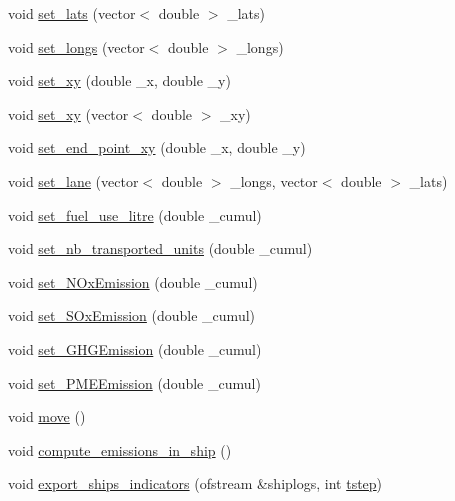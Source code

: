 \begin{DoxyCompactItemize}
\item 
void \mbox{\hyperlink{class_ship_afa49566bec8c627b559d81d2ae8aee2a}{set\+\_\+lats}} (vector$<$ double $>$ \+\_\+lats)
\item 
void \mbox{\hyperlink{class_ship_ae2ad397d3d52205c5cf9ee0f19ad2b12}{set\+\_\+longs}} (vector$<$ double $>$ \+\_\+longs)
\item 
void \mbox{\hyperlink{class_ship_a66be1579e64ee188b0a5f4f77f4490e0}{set\+\_\+xy}} (double \+\_\+x, double \+\_\+y)
\item 
void \mbox{\hyperlink{class_ship_a2729dc6f1951abf423f8a8e2fe898f01}{set\+\_\+xy}} (vector$<$ double $>$ \+\_\+xy)
\item 
void \mbox{\hyperlink{class_ship_a131d5e3de4dc210a89e53c6c39dbaa29}{set\+\_\+end\+\_\+point\+\_\+xy}} (double \+\_\+x, double \+\_\+y)
\item 
void \mbox{\hyperlink{class_ship_a53699692b9cb3fa78cbe05c5e6d0f5e8}{set\+\_\+lane}} (vector$<$ double $>$ \+\_\+longs, vector$<$ double $>$ \+\_\+lats)
\item 
void \mbox{\hyperlink{class_ship_a78811fbbb53086b1c336ec758480140b}{set\+\_\+fuel\+\_\+use\+\_\+litre}} (double \+\_\+cumul)
\item 
void \mbox{\hyperlink{class_ship_a152241416d67988ce67ce8353e83bee9}{set\+\_\+nb\+\_\+transported\+\_\+units}} (double \+\_\+cumul)
\item 
void \mbox{\hyperlink{class_ship_a368187285b4d3a5f9e3c9e873505b4cf}{set\+\_\+\+N\+Ox\+Emission}} (double \+\_\+cumul)
\item 
void \mbox{\hyperlink{class_ship_aeea91e3f1b6252ae8737738f1cc71985}{set\+\_\+\+S\+Ox\+Emission}} (double \+\_\+cumul)
\item 
void \mbox{\hyperlink{class_ship_a5a5d9299ad16c3ccc82ee597d7416187}{set\+\_\+\+G\+H\+G\+Emission}} (double \+\_\+cumul)
\item 
void \mbox{\hyperlink{class_ship_a7f47f560d3545d0eae8a89c54b4e0e2c}{set\+\_\+\+P\+M\+E\+Emission}} (double \+\_\+cumul)
\item 
void \mbox{\hyperlink{class_ship_a20a5c250b9503f8452d17bd4db0caa59}{move}} ()
\item 
void \mbox{\hyperlink{class_ship_a548c2595985e159dca37da2e1397972e}{compute\+\_\+emissions\+\_\+in\+\_\+ship}} ()
\item 
void \mbox{\hyperlink{class_ship_ae3b28abc6c66777fd31603bc737e5247}{export\+\_\+ships\+\_\+indicators}} (ofstream \&shiplogs, int \mbox{\hyperlink{thread__vessels_8cpp_a84bc73d278de929ec9974e1a95d9b23a}{tstep}})
\end{DoxyCompactItemize}


